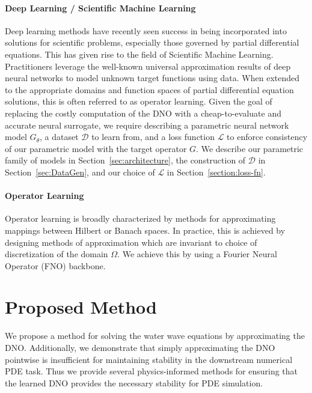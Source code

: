 \documentclass{article}
\begin{document}
\paragraph{Deep Learning / Scientific Machine Learning}
Deep learning methods have recently seen success in being incorporated into
solutions for scientific problems, especially those governed by partial
differential equations. This has given rise to the field of Scientific
Machine Learning. Practitioners leverage the well-known universal
approximation results of deep neural networks to model unknown target
functions using data. When extended to the appropriate domains and function
spaces of partial differential equation solutions, this is often referred
to as operator learning.
Given the goal of replacing the costly computation of the DNO with a
cheap-to-evaluate and accurate neural surrogate, we require describing a
parametric neural network model $G_\theta$, a dataset $\mathcal D$ to learn
from, and a loss function $\mathcal L$ to enforce consistency of our
parametric model with the target operator $G$. We describe our parametric
family of models in Section~\ref{sec:architecture}, the construction of
$\mathcal D$ in Section~\ref{sec:DataGen}, and our choice of $\mathcal L$
in Section~\ref{section:loss-fn}.

\paragraph{Operator Learning}
Operator learning is broadly characterized by methods for approximating
mappings between Hilbert or Banach spaces. In practice, this is achieved by
designing methods of approximation which are invariant to choice of
discretization of the domain $\Omega$. We achieve this by using a Fourier
Neural Operator (FNO) backbone.

\section{Proposed Method}
We propose a method for solving the water wave equations by approximating
the DNO. Additionally, we demonstrate that simply approximating the DNO
pointwise is insufficient for maintaining stability in the downstream
numerical PDE task. Thus we provide several physics-informed methods for
ensuring that the learned DNO provides the necessary stability for PDE
simulation.
\end{document}
